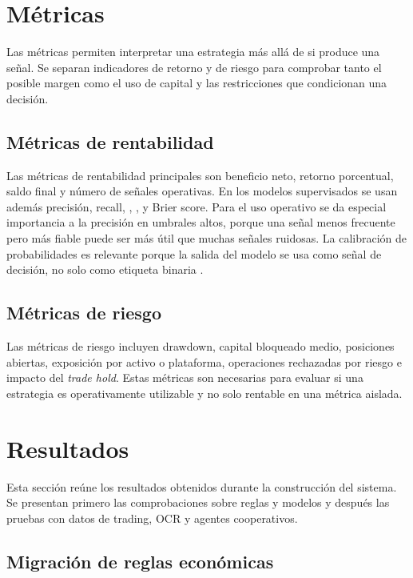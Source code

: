 \section{Métricas}

Las métricas permiten interpretar una estrategia más allá de si produce una señal. Se separan indicadores de retorno y de riesgo para comprobar tanto el posible margen como el uso de capital y las restricciones que condicionan una decisión.

\subsection{Métricas de rentabilidad}

Las métricas de rentabilidad principales son beneficio neto, retorno porcentual, saldo final y número de señales operativas. En los modelos supervisados se usan además precisión, recall, , ,  y Brier score. Para el uso operativo se da especial importancia a la precisión en umbrales altos, porque una señal menos frecuente pero más fiable puede ser más útil que muchas señales ruidosas. La calibración de probabilidades es relevante porque la salida del modelo se usa como señal de decisión, no solo como etiqueta binaria \cite{niculescu2005predicting}.

\subsection{Métricas de riesgo}

Las métricas de riesgo incluyen drawdown, capital bloqueado medio, posiciones abiertas, exposición por activo o plataforma, operaciones rechazadas por riesgo e impacto del \textit{trade hold}. Estas métricas son necesarias para evaluar si una estrategia es operativamente utilizable y no solo rentable en una métrica aislada.

\section{Resultados}

Esta sección reúne los resultados obtenidos durante la construcción del sistema. Se presentan primero las comprobaciones sobre reglas y modelos y después las pruebas con datos de trading, OCR y agentes cooperativos.

\subsection{Migración de reglas económicas}

